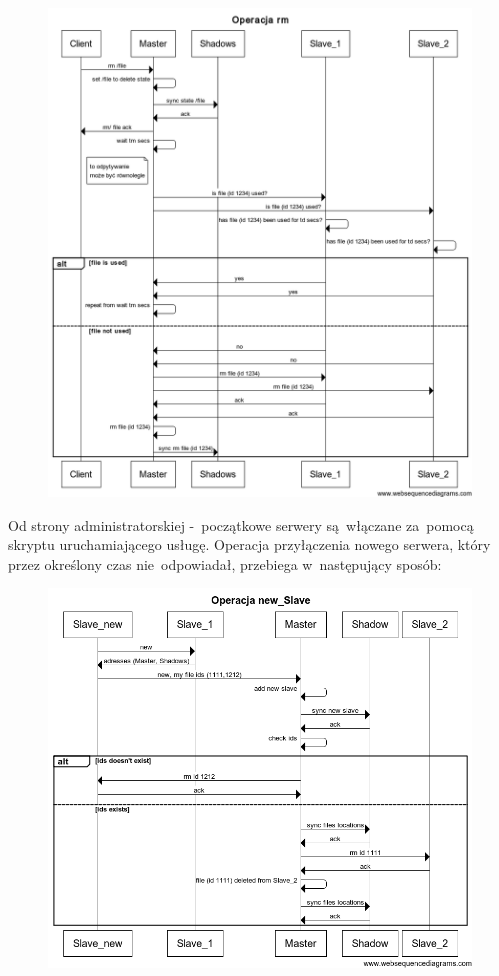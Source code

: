 \begin{figure}[H]
\center
\flushleft
\includegraphics[keepaspectratio=true, scale=0.47]{img/rm_op.png}
\end{figure}

Od strony administratorskiej -~początkowe serwery są~włączane za~pomocą skryptu
uruchamiającego usługę. Operacja przyłączenia nowego serwera, który przez
określony czas nie~odpowiadał, przebiega w~następujący sposób:
\begin{figure}[H]
\center
\flushleft
\includegraphics[keepaspectratio=true, scale=0.5]{img/new_slave_op.png}
\end{figure}